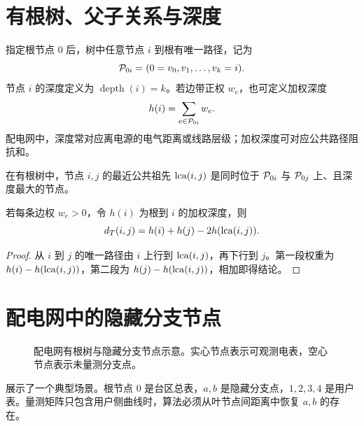 \section{有根树、父子关系与深度}

指定根节点 $0$ 后，树中任意节点 $i$ 到根有唯一路径，记为
\begin{equation}
  \mathcal{P}_{0i}=(0=v_0,v_1,\ldots,v_k=i).
\end{equation}
节点 $i$ 的深度定义为 $\operatorname{depth}(i)=k$。若边带正权 $w_e$，也可定义加权深度
\begin{equation}
  h(i)=\sum_{e\in \mathcal{P}_{0i}} w_e .
\end{equation}
配电网中，深度常对应离电源的电气距离或线路层级；加权深度可对应公共路径阻抗和。

\begin{definition}[最近公共祖先]
在有根树中，节点 $i,j$ 的最近公共祖先 $\operatorname{lca}(i,j)$ 是同时位于 $\mathcal{P}_{0i}$ 与 $\mathcal{P}_{0j}$ 上、且深度最大的节点。
\end{definition}

\begin{proposition}
\label{prop:lca_distance}
若每条边权 $w_e>0$，令 $h(i)$ 为根到 $i$ 的加权深度，则
\begin{equation}
  d_T(i,j)=h(i)+h(j)-2h(\operatorname{lca}(i,j)).
\end{equation}
\end{proposition}

\begin{proof}
从 $i$ 到 $j$ 的唯一路径由 $i$ 上行到 $\operatorname{lca}(i,j)$，再下行到 $j$。第一段权重为 $h(i)-h(\operatorname{lca}(i,j))$，第二段为 $h(j)-h(\operatorname{lca}(i,j))$，相加即得结论。
\end{proof}

\section{配电网中的隐藏分支节点}

\begin{figure}[htbp]
  \centering
  
  \caption{配电网有根树与隐藏分支节点示意。实心节点表示可观测电表，空心节点表示未量测分支点。}
  \label{fig:distribution_tree_hidden}
\end{figure}

展示了一个典型场景。根节点 $0$ 是台区总表，$a,b$ 是隐藏分支点，$1,2,3,4$ 是用户表。量测矩阵只包含用户侧曲线时，算法必须从叶节点间距离中恢复 $a,b$ 的存在。

